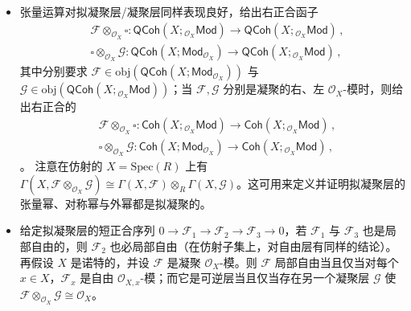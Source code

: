 \begin{Rem}
\begin{itemize}[leftmargin=0.5cm]
	\item 张量运算对拟凝聚层/凝聚层同样表现良好，给出右正合函子 \begin{equation}\label{tensoronqcoh}
		\begin{aligned}
			&\mathcal{F}\otimes_{\mathcal{O}_X}\!\square:\mathsf{QCoh}(X;{}_{\mathcal{O}_X}\!\mathsf{Mod})\rightarrow \mathsf{QCoh}(X;{}_{\mathcal{O}_X}\!\mathsf{Mod})\,, \\
			&\square\!\otimes_{\mathcal{O}_X}\mathcal{G}:\mathsf{QCoh}(X;\mathsf{Mod}_{\mathcal{O}_X})\rightarrow \mathsf{QCoh}(X;{}_{\mathcal{O}_X}\!\mathsf{Mod})\,,
		\end{aligned}
	\end{equation}
	其中分别要求 $\mathcal{F}\in\text{obj}(\mathsf{QCoh}(X;\mathsf{Mod}_{\mathcal{O}_X}))$ 与 $\mathcal{G}\in\text{obj}(\mathsf{QCoh}(X;{}_{\mathcal{O}_X}\!\mathsf{Mod}))$；当 $\mathcal{F},\mathcal{G}$ 分别是凝聚的右、左 $\mathcal{O}_X$-模时，则给出右正合的
	\begin{equation}\label{tensoroncoh}
		\begin{aligned}
			&\mathcal{F}\otimes_{\mathcal{O}_X}\!\square:\mathsf{Coh}(X;{}_{\mathcal{O}_X}\!\mathsf{Mod})\rightarrow \mathsf{Coh}(X;{}_{\mathcal{O}_X}\!\mathsf{Mod})\,, \\
			&\square\!\otimes_{\mathcal{O}_X}\mathcal{G}:\mathsf{Coh}(X;\mathsf{Mod}_{\mathcal{O}_X})\rightarrow \mathsf{Coh}(X;{}_{\mathcal{O}_X}\!\mathsf{Mod})\,,
		\end{aligned}
	\end{equation}。
	\newline 注意在仿射的 $X=\text{Spec}(R)$ 上有 $\Gamma(X,\mathcal{F}\otimes_{\mathcal{O}_X}\!\mathcal{G})\cong\Gamma(X,\mathcal{F})\otimes_R \Gamma(X,\mathcal{G})$。这可用来定义并证明拟凝聚层的张量幂、对称幂与外幂都是拟凝聚的。
	
	\item 给定拟凝聚层的短正合序列 $0\rightarrow\mathcal{F}_1\rightarrow\mathcal{F}_2\rightarrow\mathcal{F}_3\rightarrow 0$，若 $\mathcal{F}_1$ 与 $\mathcal{F}_3$ 也是局部自由的，则 $\mathcal{F}_2$ 也必局部自由（在仿射子集上，对自由层有同样的结论）。
	\newline 再假设 $X$ 是诺特的，并设 $\mathcal{F}$ 是凝聚 $\mathcal{O}_X$-模。则 $\mathcal{F}$ 局部自由当且仅当对每个 $x\in X$，$\mathcal{F}_x$ 是自由 $\mathcal{O}_{X,x}$-模；而它是可逆层当且仅当存在另一个凝聚层 $\mathcal{G}$ 使 $\mathcal{F}\otimes_{\mathcal{O}_X}\!\mathcal{G}\cong\mathcal{O}_X$。 
\end{itemize}
\end{Rem}

